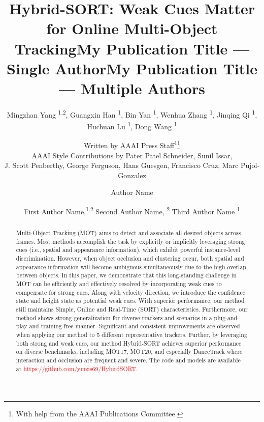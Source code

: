 \documentclass[letterpaper]{article} \usepackage{aaai23}  \usepackage{times}  \usepackage{helvet}  \usepackage{courier}  \usepackage[hyphens]{url}  \usepackage{graphicx} \urlstyle{rm} \def\UrlFont{\rm}  \usepackage{natbib}  \usepackage{caption} \frenchspacing  \setlength{\pdfpagewidth}{8.5in}  \setlength{\pdfpageheight}{11in}  \usepackage{algorithm}
\title{Hybrid-SORT: Weak Cues Matter for Online Multi-Object Tracking}
\author {
Mingzhan Yang \textsuperscript{\rm 1,\rm 2}\equalcontrib,
    Guangxin Han \textsuperscript{\rm 1}\equalcontrib, 
    Bin Yan \textsuperscript{\rm 1},
    Wenhua Zhang \textsuperscript{\rm 1},
    Jinqing Qi \textsuperscript{\rm 1},
    Huchuan Lu \textsuperscript{\rm 1},
    Dong Wang \textsuperscript{\rm 1}
}
\author{
Written by AAAI Press Staff\textsuperscript{\rm 1}\thanks{With help from the AAAI Publications Committee.}\\
    AAAI Style Contributions by Pater Patel Schneider,
    Sunil Issar,\\
    J. Scott Penberthy,
    George Ferguson,
    Hans Guesgen,
    Francisco Cruz\equalcontrib,
    Marc Pujol-Gonzalez\equalcontrib
}
\title{My Publication Title --- Single Author}
\author {
    Author Name
}
\title{My Publication Title --- Multiple Authors}
\author {
First Author Name,\textsuperscript{\rm 1,\rm 2}
    Second Author Name, \textsuperscript{\rm 2}
    Third Author Name \textsuperscript{\rm 1}
}
\begin{document}
\maketitle

\begin{abstract}
Multi-Object Tracking (MOT) aims to detect and associate all desired objects across frames. Most methods accomplish the task by explicitly or implicitly leveraging strong cues (i.e., spatial and appearance information), which exhibit powerful instance-level discrimination. However, when object occlusion and clustering occur, both spatial and appearance information will become ambiguous simultaneously due to the high overlap between objects. In this paper, we demonstrate that this long-standing challenge in MOT can be efficiently and effectively resolved by incorporating weak cues to compensate for strong cues. Along with velocity direction, we introduce the confidence state and height state as potential weak cues. With superior performance, our method still maintains Simple, Online and Real-Time (SORT) characteristics. Furthermore, our method shows strong generalization for diverse trackers and scenarios in a plug-and-play and training-free manner. Significant and consistent improvements are observed when applying our method to 5 different representative trackers. Further, by leveraging both strong and weak cues, our method Hybrid-SORT achieves superior performance on diverse benchmarks, including MOT17, MOT20, and especially DanceTrack where interaction and occlusion are frequent and severe. The code and models are available at \textcolor{red}{https://github.com/ymzis69/HybirdSORT}. 

\end{abstract}
\end{document}

